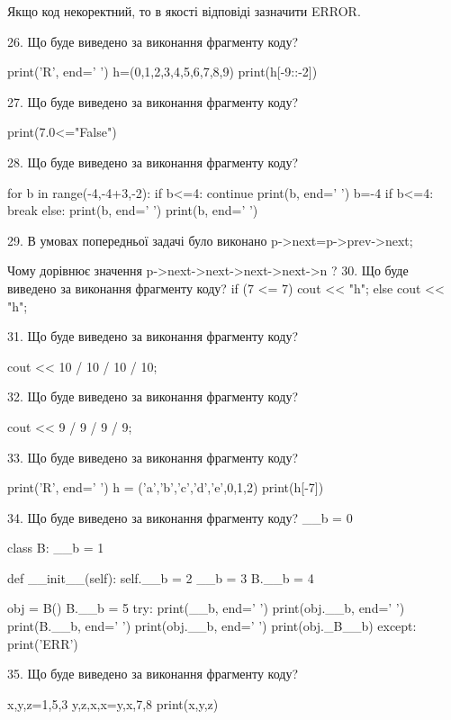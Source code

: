 \documentclass[11pt]{article}
\begin{document}
Якщо код некоректний, то в якості відповіді зазначити ERROR.



26. Що буде виведено за виконання фрагменту коду?

print('R', end=' ')
h=(0,1,2,3,4,5,6,7,8,9)
print(h[-9::-2])


27. Що буде виведено за виконання фрагменту коду?

print(7.0<="False")

28. Що буде виведено за виконання фрагменту коду?

for b in range(-4,-4+3,-2):
    if b<=4:
        continue
    print(b, end=' ')
    b=-4
    if b<=4:
        break
else:
    print(b, end=' ')
print(b, end=' ')

29. 
В умовах попередньої задачі було виконано p->next=p->prev->next;

Чому дорівнює значення p->next->next->next->next->n ?
30. Що буде виведено за виконання фрагменту коду?
if (7 <= 7)
    cout << "h";
else
    cout << "h";


31. Що буде виведено за виконання фрагменту коду?

cout << 10 / 10 / 10 / 10;

32. Що буде виведено за виконання фрагменту коду?

cout << 9 / 9 / 9 / 9;

33. Що буде виведено за виконання фрагменту коду?

print('R', end=' ')
h = ('a','b','c','d','e',0,1,2)
print(h[-7])


34. Що буде виведено за виконання фрагменту коду?
__b = 0

class B:
    __b = 1
    
    def __init__(self):
        self.__b = 2
        __b = 3
        B.__b = 4

obj = B()
B.__b = 5
try:
    print(__b, end=' ')
    print(obj.__b, end=' ')
    print(B.__b, end=' ')
    print(obj.__b, end=' ')
    print(obj._B__b)
except:
    print('ERR')

35. Що буде виведено за виконання фрагменту коду?

x,y,z=1,5,3
y,z,x,x=y,x,7,8
print(x,y,z)
\end{document}
